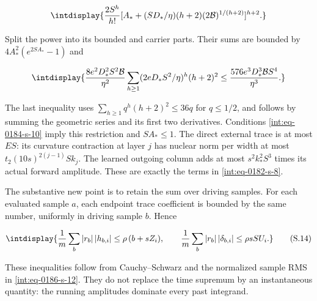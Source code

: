 \begingroup\renewcommand{\theHequation}{intdisplay.382}
\begin{equation*}
\intdisplay{
\frac{2S^h}{h!}
 [A_*+(SD_*/\eta)(h+2)(2\mathcal B)^{1/(h+2)}]^{h+2}.
}
\end{equation*}
\endgroup


Split the power into its bounded and carrier parts. Their sums are bounded by \(4A_*^2(e^{2SA_*}-1)\) and


\begingroup\renewcommand{\theHequation}{intdisplay.383}
\begin{equation*}
\intdisplay{
\frac{8e^2D_*^2S^2\mathcal B}{\eta^2}
\sum_{h\ge1}(2eD_*S^2/\eta)^h(h+2)^2
\le\frac{576e^3D_*^3\mathcal B S^4}{\eta^3}.
}
\end{equation*}
\endgroup


The last inequality uses \(\sum_{h\ge1}q^h(h+2)^2\le36q\) for \(q\le1/2\), and follows by summing the geometric series and its first two derivatives. Conditions \eqref{int:eq-0184-s-10} imply this restriction and \(SA_*\le1\). The direct external trace is at most \(ES\): its curvature contraction at layer \(j\) has nuclear norm per width at most \(t_2(10s)^{2(j-1)}Sk_j\). The learned outgoing column adds at most \(s^2k_*^2S^3\) times its actual forward amplitude. These are exactly the terms in \eqref{int:eq-0182-s-8}.



The substantive new point is to retain the sum over driving samples. For each evaluated sample \(a\), each endpoint trace coefficient is bounded by the same number, uniformly in driving sample \(b\). Hence


\begingroup\renewcommand{\theHequation}{intdisplay.384}
\begin{equation}
\intdisplay{
\frac1m\sum_b|r_b|\,|h_{b,i}|\le
\rho\,(b+sZ_i),\qquad
\frac1m\sum_b|r_b|\,|\delta_{b,i}|\le\rho sS U_i.
}
\tag{S.14}
\label{int:eq-0188-s-14}
\end{equation}
\endgroup


These inequalities follow from Cauchy--Schwarz and the normalized sample RMS in \eqref{int:eq-0186-s-12}. They do not replace the time supremum by an instantaneous quantity: the running amplitudes dominate every past integrand.


